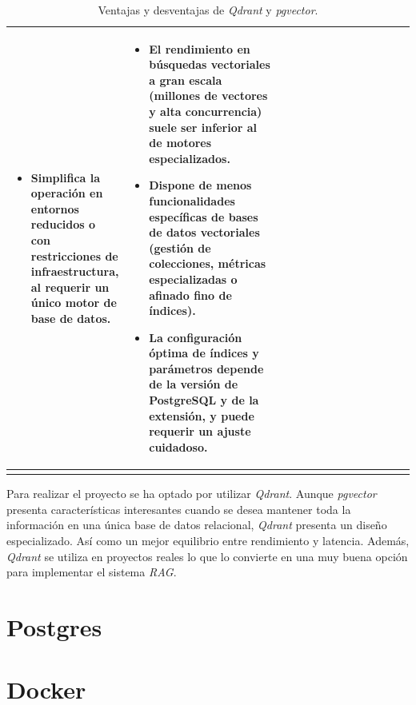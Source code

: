 \begin{longtable}{
		p{0.20\linewidth}
		p{0.40\linewidth}
		p{0.40\linewidth}
	}
\begin{itemize}
        \item Simplifica la operación en entornos reducidos o con restricciones de infraestructura, al requerir un único motor de base de datos.
      \end{itemize}
      &
      \begin{itemize}
        \tightlist
        \item El rendimiento en búsquedas vectoriales a gran escala (millones de vectores y alta concurrencia) suele ser inferior al de motores especializados.
        \item Dispone de menos funcionalidades específicas de bases de datos vectoriales (gestión de colecciones, métricas especializadas o afinado fino de índices).
        \item La configuración óptima de índices y parámetros depende de la versión de PostgreSQL y de la extensión, y puede requerir un ajuste cuidadoso.
      \end{itemize}
      \\
   \bottomrule
   \caption{Ventajas y desventajas de \textit{Qdrant} y \textit{pgvector}.}
	\label{tab:bases-vectoriales}\\
\end{longtable}

Para realizar el proyecto se ha optado por utilizar \textit{Qdrant}. Aunque \textit{pgvector} presenta características interesantes cuando se desea mantener toda la información en una única base de datos relacional, \textit{Qdrant} presenta un diseño especializado. Así como un mejor equilibrio entre rendimiento y latencia. Además, \textit{Qdrant} se utiliza en proyectos reales lo que lo convierte en una muy buena opción para implementar el sistema \textit{RAG}.

\section{Postgres}

\section{Docker}